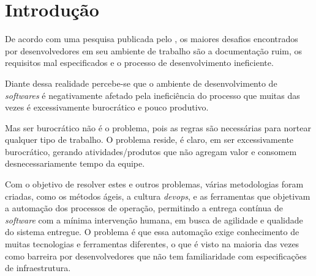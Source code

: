 \documentclass[
12pt,				%
openright,			%
oneside,			%
a4paper,			%
english,			%
french,				%
spanish,			%
brazil,				%
]{abntex2}
\begin{document}

\tableofcontents*
\cleardoublepage


\textual

\chapter{Introdução}
De acordo com uma pesquisa publicada pelo , os maiores desafios encontrados por desenvolvedores em seu ambiente de trabalho são a documentação ruim, os requisitos mal especificados e o processo de desenvolvimento ineficiente.

Diante dessa realidade percebe-se que o ambiente de desenvolvimento de \textit{softwares} é negativamente afetado pela ineficiência do processo que muitas das vezes é excessivamente burocrático e pouco produtivo.

\begin{citacao}
	Mas ser burocrático não é o problema, pois as regras são necessárias para nortear qualquer tipo de trabalho. O problema reside, é claro, em ser excessivamente burocrático, gerando atividades/produtos que não agregam valor e consomem desnecessariamente tempo da equipe. \cite{EBusiness:ManifestoAgil}
\end{citacao}

Com o objetivo de resolver estes e outros problemas, várias metodologias foram criadas, como os métodos ágeis, a cultura \textit{devops}, e as ferramentas que objetivam a automação dos processos de operação, permitindo a entrega contínua de \textit{software} com a mínima intervenção humana, em busca de agilidade e qualidade do sistema entregue. O problema é que essa automação exige conhecimento de muitas tecnologias e ferramentas diferentes, o que é visto na maioria das vezes como barreira por desenvolvedores que não tem familiaridade com especificações de infraestrutura.
\end{document}
